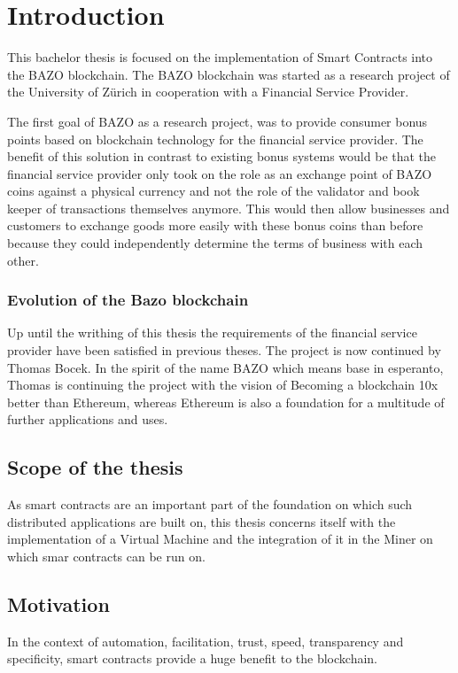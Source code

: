 \chapter{Introduction}
\thispagestyle{main} %

This bachelor thesis is focused on the implementation of Smart Contracts into the BAZO blockchain. The BAZO blockchain was started as a research project of the University of Zürich in cooperation with a Financial Service Provider. 

The first goal of BAZO as a research project, was to provide consumer bonus points based on blockchain technology for the financial service provider. The benefit of this solution in contrast to existing bonus systems would be that the financial service provider only took on the role as an exchange point of BAZO coins against a physical currency and not the role of the validator and book keeper of transactions themselves anymore. This would then allow businesses and customers to exchange goods more easily with these bonus coins than before because they could independently determine the terms of business with each other.

\subsection{Evolution of the Bazo blockchain}
Up until the writhing of this thesis the requirements of the financial service provider have been satisfied in previous theses. The project is now continued by Thomas Bocek. In the spirit of the name BAZO which means base in esperanto, Thomas is continuing the project with the vision of \frqq Becoming a blockchain 10x better than Ethereum\flqq, whereas Ethereum is also a foundation for a multitude of further applications and uses.

\section{Scope of the thesis}
As smart contracts are an important part of the foundation on which such distributed applications are built on, this thesis concerns itself with the implementation of a Virtual Machine and the integration of it in the Miner on which smar contracts can be run on.

\section{Motivation}
In the context of automation, facilitation, trust, speed, transparency and specificity, smart contracts provide a huge benefit to the blockchain.


